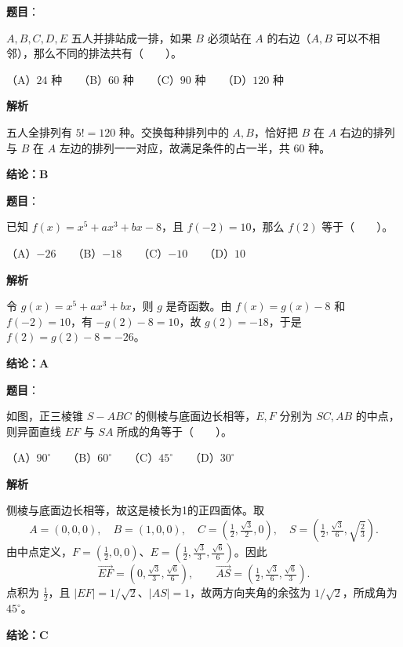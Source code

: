 \begin{answer}

\textbf{题目}：

$A,B,C,D,E$ 五人并排站成一排，如果 $B$ 必须站在 $A$ 的右边（$A,B$ 可以不相邻），那么不同的排法共有\mbox{（　　）}。

（A）$24$ 种　　（B）$60$ 种　　（C）$90$ 种　　（D）$120$ 种

\textbf{解析}

五人全排列有 $5!=120$ 种。交换每种排列中的 $A,B$，恰好把 $B$ 在 $A$ 右边的排列与 $B$ 在 $A$ 左边的排列一一对应，故满足条件的占一半，共 $60$ 种。

\textbf{结论：B}


\end{answer}
\begin{answer}

\textbf{题目}：

已知 $f(x)=x^5+ax^3+bx-8$，且 $f(-2)=10$，那么 $f(2)$ 等于\mbox{（　　）}。

（A）$-26$　　（B）$-18$　　（C）$-10$　　（D）$10$

\textbf{解析}

令 $g(x)=x^5+ax^3+bx$，则 $g$ 是奇函数。由 $f(x)=g(x)-8$ 和 $f(-2)=10$，有 $-g(2)-8=10$，故 $g(2)=-18$，于是 $f(2)=g(2)-8=-26$。

\textbf{结论：A}


\end{answer}
\begin{answer}

\textbf{题目}：

如图，正三棱锥 $S-ABC$ 的侧棱与底面边长相等，$E,F$ 分别为 $SC,AB$ 的中点，则异面直线 $EF$ 与 $SA$ 所成的角等于\mbox{（　　）}。
\nopagebreak[4]
\begin{center}\end{center}
\nopagebreak[4]
（A）$90^\circ$　　（B）$60^\circ$　　（C）$45^\circ$　　（D）$30^\circ$

\textbf{解析}

侧棱与底面边长相等，故这是棱长为1的正四面体。取
\nopagebreak[4]
\[
A=(0,0,0),\quad B=(1,0,0),\quad C=(\tfrac12,\tfrac{\sqrt3}{2},0),\quad S=(\tfrac12,\tfrac{\sqrt3}{6},\sqrt{\tfrac23}).
\]
由中点定义，$F=(\frac12,0,0)$、$E=(\frac12,\frac{\sqrt3}{3},\frac{\sqrt6}{6})$。因此
\nopagebreak[4]
\[
\overrightarrow{EF}=(0,\tfrac{\sqrt3}{3},\tfrac{\sqrt6}{6}),\qquad
\overrightarrow{AS}=(\tfrac12,\tfrac{\sqrt3}{6},\tfrac{\sqrt6}{3}).
\]
点积为 $\frac12$，且 $|EF|=1/\sqrt2$、$|AS|=1$，故两方向夹角的余弦为 $1/\sqrt2$，所成角为 $45^\circ$。

\textbf{结论：C}


\end{answer}
